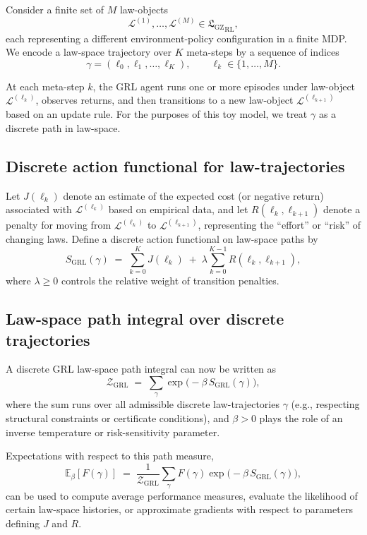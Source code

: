 \documentclass[11pt]{book}
\newcommand{\GZLS}{\ensuremath{\mathfrak{L}_{\mathrm{GZ}}}}
\theoremstyle{plain}
\theoremstyle{definition}
\theoremstyle{remark}
\begin{document}
Consider a finite set of $M$ law-objects
\[
   \mathcal{L}^{(1)},\dots,\mathcal{L}^{(M)} \in {\GZLS}_{\mathrm{RL}},
\]
each representing a different environment-policy configuration in
a finite MDP. We encode a law-space trajectory over $K$ meta-steps
by a sequence of indices
\[
   \gamma = (\ell_0,\ell_1,\dots,\ell_K),
   \qquad \ell_k \in \{1,\dots,M\}.
\]

At each meta-step $k$, the GRL agent runs one or more episodes under
law-object $\mathcal{L}^{(\ell_k)}$, observes returns, and then
transitions to a new law-object $\mathcal{L}^{(\ell_{k+1})}$ based
on an update rule. For the purposes of this toy model, we treat
$\gamma$ as a discrete path in law-space.

\subsection*{Discrete action functional for law-trajectories}

Let $J(\ell_k)$ denote an estimate of the expected cost (or negative
return) associated with $\mathcal{L}^{(\ell_k)}$ based on empirical
data, and let $R(\ell_k,\ell_{k+1})$ denote a penalty for moving
from $\mathcal{L}^{(\ell_k)}$ to $\mathcal{L}^{(\ell_{k+1})}$,
representing the ``effort'' or ``risk'' of changing laws. Define
a discrete action functional on law-space paths by
\[
   S_{\mathrm{GRL}}(\gamma)
   \;=\;
   \sum_{k=0}^{K} J(\ell_k)
   \;+\;
   \lambda \sum_{k=0}^{K-1} R(\ell_k,\ell_{k+1}),
\]
where $\lambda \ge 0$ controls the relative weight of transition
penalties.

\subsection*{Law-space path integral over discrete trajectories}

A discrete GRL law-space path integral can now be written as
\[
   \mathcal{Z}_{\mathrm{GRL}}
   \;=\;
   \sum_{\gamma}
   \exp\!\bigl(-\beta\,S_{\mathrm{GRL}}(\gamma)\bigr),
\]
where the sum runs over all admissible discrete law-trajectories
$\gamma$ (e.g., respecting structural constraints or certificate
conditions), and $\beta > 0$ plays the role of an inverse
temperature or risk-sensitivity parameter.

Expectations with respect to this path measure,
\[
   \mathbb{E}_{\beta}[F(\gamma)]
   \;=\;
   \frac{1}{\mathcal{Z}_{\mathrm{GRL}}}
   \sum_{\gamma} F(\gamma)
   \exp\!\bigl(-\beta\,S_{\mathrm{GRL}}(\gamma)\bigr),
\]
can be used to compute average performance measures, evaluate the
likelihood of certain law-space histories, or approximate gradients
with respect to parameters defining $J$ and $R$.
\end{document}

